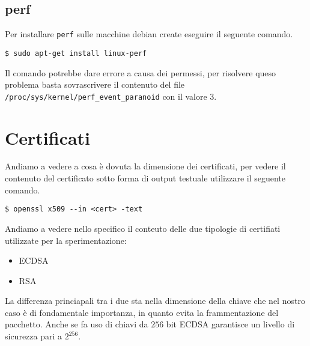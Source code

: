 \documentclass[
10pt, %
a4paper, %
oneside, %
headinclude,footinclude, %
BCOR5mm, %
]{scrartcl}
\begin{document}
\subsection*{perf}

Per installare \lstinline|perf| sulle macchine debian create eseguire il seguente comando.
\begin{lstlisting}
$ sudo apt-get install linux-perf
\end{lstlisting}
\noindent
Il comando potrebbe dare errore a causa dei permessi, per risolvere queso problema basta sovrascrivere il contenuto
del file \lstinline|/proc/sys/kernel/perf_event_paranoid| con il valore $3$.

\newpage

\section{Certificati}
\hypertarget{certificati}{}
Andiamo a vedere a cosa è dovuta la dimensione dei certificati, per vedere il contenuto del certificato sotto forma di output testuale utilizzare il seguente comando.
\begin{lstlisting}
$ openssl x509 --in <cert> -text
\end{lstlisting}

\vspace*{0.2cm}
\noindent
Andiamo a vedere nello specifico il conteuto delle due tipologie di certifiati utilizzate per la sperimentazione:
\begin{itemize}
    \item ECDSA
    \item RSA
\end{itemize}
\vspace*{0.2cm}
\noindent
La differenza princiapali tra i due sta nella dimensione della chiave che nel nostro caso è di fondamentale importanza, in quanto evita la frammentazione del pacchetto.
Anche se fa uso di chiavi da $256$ bit ECDSA garantisce un livello di sicurezza pari a $2^{256}$.
\end{document}
